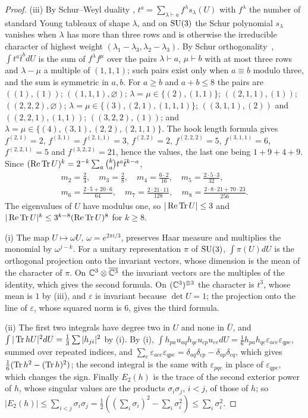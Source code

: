 \begin{proof}
(iii) By Schur--Weyl duality \cite[Thm.~6.3]{FH91}, $t^a=\sum_{\lambda\vdash
a}f^\lambda s_\lambda(U)$ with $f^\lambda$ the number of standard Young
tableaux of shape $\lambda$, and on $\mathrm{SU}(3)$ the Schur polynomial $s_\lambda$
vanishes when $\lambda$ has more than three rows and is otherwise the
irreducible character of highest weight $(\lambda_1-\lambda_3,\lambda_2-
\lambda_3)$. By Schur orthogonality~\cite[Ch.~2]{Bum13}, $\int t^a\bar
t^bdU$ is the sum of $f^\lambda f^\mu$ over the pairs $\lambda\vdash a$,
$\mu\vdash b$ with at most three rows and $\lambda-\mu$ a multiple of
$(1,1,1)$; such pairs exist only when $a\equiv b$ modulo three, and the sum
is symmetric in $a,b$. For $a\ge b$ and $a+b\le8$ the pairs are
$((1),(1))$; $((1,1,1),\varnothing)$; $\lambda=\mu\in\{(2),(1,1)\}$;
$((2,1,1),(1))$; $((2,2,2),\varnothing)$; $\lambda=\mu\in\{(3),(2,1),
(1,1,1)\}$; $((3,1,1),(2))$ and $((2,2,1),(1,1))$; $((3,2,2),(1))$; and
$\lambda=\mu\in\{(4),(3,1),(2,2),(2,1,1)\}$. The hook length formula gives
$f^{(2,1)}=2$, $f^{(3,1)}=f^{(2,1,1)}=3$, $f^{(2,2)}=2$, $f^{(2,2,2)}=5$,
$f^{(3,1,1)}=6$, $f^{(2,2,1)}=5$ and $f^{(3,2,2)}=21$, hence the values, the
last one being $1+9+4+9$. Since $(\operatorname{Re}\operatorname{Tr} U)^k=2^{-k}\sum_a\binom kat^a\bar
t^{k-a}$,
\begin{gather*}
m_2=\tfrac{2}{4},\quad m_3=\tfrac28,\quad m_4=\tfrac{6\cdot2}{16},\quad
m_5=\tfrac{2\cdot5\cdot3}{32},\\
m_6=\tfrac{2\cdot5+20\cdot6}{64},\quad m_7=\tfrac{2\cdot21\cdot11}{128},
\quad m_8=\tfrac{2\cdot8\cdot21+70\cdot23}{256}.
\end{gather*}
The eigenvalues of $U$ have modulus one, so $|\operatorname{Re}\operatorname{Tr} U|\le3$ and
$|\operatorname{Re}\operatorname{Tr} U|^k\le3^{k-8}(\operatorname{Re}\operatorname{Tr} U)^8$ for $k\ge8$.

(i) The map $U\mapsto\omega U$, $\omega=e^{2\pi i/3}$, preserves Haar
measure and multiplies the monomial by $\omega^{j-k}$. For a unitary
representation $\pi$ of $\mathrm{SU}(3)$, $\int\pi(U)dU$ is the orthogonal
projection onto the invariant vectors, whose dimension is the mean of the
character of $\pi$. On $\mathbb{C}^3\otimes\overline{\mathbb{C}^3}$ the invariant vectors
are the multiples of the identity, which gives the second formula. On
$(\mathbb{C}^3)^{\otimes3}$ the character is $t^3$, whose mean is $1$ by (iii), and
$\varepsilon$ is invariant because $\det U=1$; the projection onto the line
of $\varepsilon$, whose squared norm is $6$, gives the third formula.

(ii) The first two integrals have degree two in $U$ and none in $\bar U$,
and $\int|\operatorname{Tr} hU|^2dU=\frac13\sum|h_{ji}|^2$ by (i). By (i),
$\int h_{pa}u_{aq}h_{qc}u_{cp}u_{ee}dU=\frac16h_{pa}h_{qc}\varepsilon_{ace}
\varepsilon_{qpe}$, summed over repeated indices, and $\sum_e
\varepsilon_{ace}\varepsilon_{qpe}=\delta_{aq}\delta_{cp}-\delta_{ap}
\delta_{cq}$, which gives $\frac16(\operatorname{Tr} h^2-(\operatorname{Tr} h)^2)$; the second integral
is the same with $\varepsilon_{pqe}$ in place of $\varepsilon_{qpe}$, which
changes the sign. Finally $E_2(h)$ is the trace of the second exterior power
of $h$, whose singular values are the products $\sigma_i\sigma_j$, $i<j$, of
those of $h$; so $|E_2(h)|\le\sum_{i<j}\sigma_i\sigma_j=\frac12((\sum_i
\sigma_i)^2-\sum_i\sigma_i^2)\le\sum_i\sigma_i^2$.
\end{proof}

